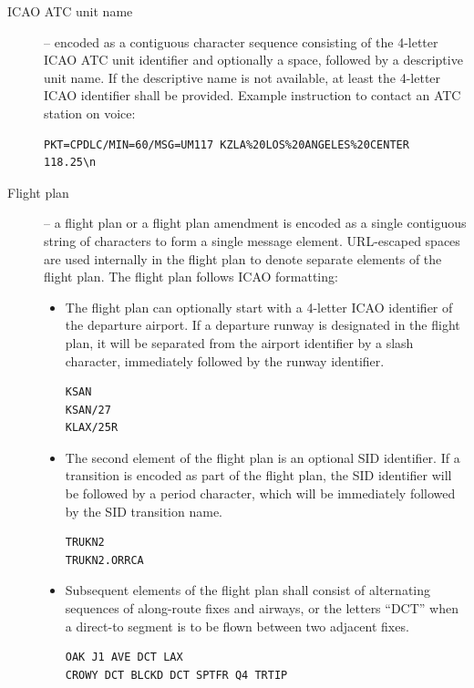 \documentclass[a4paper,12pt]{article}
\begin{document}
\begin{description}
\item[ICAO ATC unit name] -- encoded as a contiguous character sequence
consisting of the 4-letter ICAO ATC unit identifier and optionally a
space, followed by a descriptive unit name. If the descriptive name is
not available, at least the 4-letter ICAO identifier shall be provided.
Example instruction to contact an ATC station on voice:

\begin{verbatim}
PKT=CPDLC/MIN=60/MSG=UM117 KZLA%20LOS%20ANGELES%20CENTER 118.25\n
\end{verbatim}

\item[Flight plan] -- a flight plan or a flight plan amendment is encoded
as a single contiguous string of characters to form a single message
element. URL-escaped spaces are used internally in the flight plan to
denote separate elements of the flight plan. The flight plan follows ICAO
formatting:

\begin{itemize}

\item The flight plan can optionally start with a 4-letter ICAO
identifier of the departure airport. If a departure runway is designated
in the flight plan, it will be separated from the airport identifier by a
slash character, immediately followed by the runway identifier.

\begin{verbatim}
KSAN
KSAN/27
KLAX/25R
\end{verbatim}

\item The second element of the flight plan is an optional SID
identifier. If a transition is encoded as part of the flight plan, the
SID identifier will be followed by a period character, which will be
immediately followed by the SID transition name.

\begin{verbatim}
TRUKN2
TRUKN2.ORRCA
\end{verbatim}

\item Subsequent elements of the flight plan shall consist of alternating
sequences of along-route fixes and airways, or the letters ``DCT'' when a
direct-to segment is to be flown between two adjacent fixes.

\begin{verbatim}
OAK J1 AVE DCT LAX
CROWY DCT BLCKD DCT SPTFR Q4 TRTIP
\end{verbatim}


\end{itemize}
\end{description}
\end{document}
